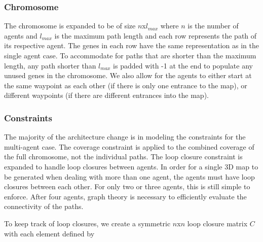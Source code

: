 \documentclass[letterpaper, 10 pt, conference]{ieeeconf}  %
\begin{document}
\subsubsection{Chromosome}
The chromosome is expanded to be of size $n$x$l_{\mathit{max}}$ where $n$ is the number of agents and $l_{\mathit{max}}$ is the maximum path length and each row represents the path of its respective agent. The genes in each row have the same representation as in the single agent case. To accommodate for paths that are shorter than the maximum length, any path shorter than $l_{\mathit{max}}$ is padded with -1 at the end to populate any unused genes in the chromosome. We also allow for the agents to either start at the same waypoint as each other (if there is only one entrance to the map), or different waypoints (if there are different entrances into the map).

%

\subsubsection{Constraints}
The majority of the architecture change is in modeling the constraints for the multi-agent case. The coverage constraint is applied to the combined coverage of the full chromosome, not the individual paths. The loop closure constraint is expanded to handle loop closures between agents. In order for a single 3D map to be generated when dealing with more than one agent, the agents must have loop closures between each other. For only two or three agents, this is still simple to enforce. After four agents, graph theory is necessary to efficiently evaluate the connectivity of the paths.

To keep track of loop closures, we create a symmetric $n$x$n$ loop closure matrix $C$ with each element defined by
\end{document}
